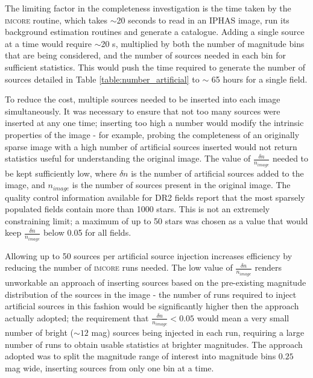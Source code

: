\documentclass[a4paper,useAMS,usenatbib]{mn2e}
\begin{document}
The limiting factor in the completeness investigation is the time taken by the \textsc{imcore} routine, which takes $\sim$20 seconds to read in an IPHAS image, run its background estimation routines and generate a catalogue. Adding a single source at a time would require $\sim$20 s, multiplied by both the number of magnitude bins that are being considered, and the number of sources needed in each bin for sufficient statistics. This would push the time required to generate the number of sources detailed in Table \ref{table:number_artificial} to $\sim$ 65 hours for a single field.

To reduce the cost, multiple sources needed to be inserted into each image simultaneously. It was necessary to ensure that not too many sources were inserted at any one time; inserting too high a number would modify the intrinsic properties of the image - for example, probing the completeness of an originally sparse image with a high number of artificial sources inserted would not return statistics useful for understanding the original image. The value of $\frac{\delta n}{n_{image}}$ needed to be kept sufficiently low, where $\delta n$ is the number of artificial sources added to the image, and $n_{image}$ is the number of sources present in the original image. The quality control information available for DR2 fields report that the most sparsely populated fields contain more than 1000 stars. This is not an extremely constraining limit; a maximum of up to 50 stars was chosen as a value that would keep $\frac{\delta n}{n_{image}}$ below 0.05 for all fields.

Allowing up to 50 sources per artificial source injection increases efficiency by reducing the number of \textsc{imcore} runs needed. The low value of $\frac{\delta n}{n_{image}}$ renders unworkable an approach of inserting sources based on the pre-existing magnitude distribution of the sources in the image - the number of runs required to inject artificial sources in this fashion would be significantly higher then the approach actually adopted; the requirement that $\frac{\delta n}{n_{image}} < 0.05$ would mean a very small number of bright ($\sim12$ mag) sources being injected in each run, requiring a large number of runs to obtain usable statistics at brighter magnitudes. The approach adopted was to split the magnitude range of interest into magnitude bins $0.25$ mag wide, inserting sources from only one bin at a time.
\end{document}
